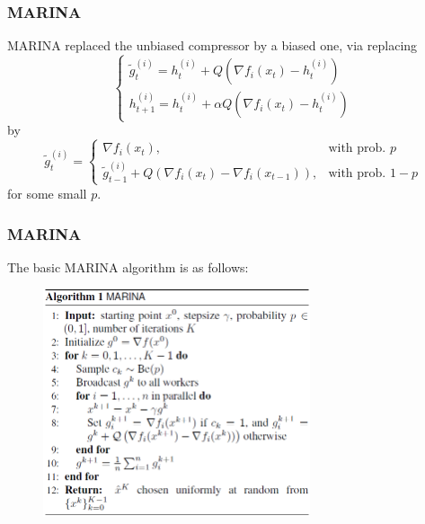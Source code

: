 \begin{frame}
\frametitle{MARINA}

MARINA \cite{gorbunov2021marina} replaced the unbiased compressor by a {\color{red}biased} one, via replacing
\begin{equation*}
\begin{cases}
\widetilde{g}^{(i)}_t = h^{(i)}_t + Q(\nabla f_i(x_t) - h^{(i)}_t) \\
h^{(i)}_{t+1} = h^{(i)}_t + \alpha Q(\nabla f_i(x_t) - h^{(i)}_t)
\end{cases}
\end{equation*}
by
\begin{equation*}
\widetilde{g}^{(i)}_t = 
\begin{cases}
\nabla f_i(x_t), & \text{with prob. } p \\
\widetilde{g}^{(i)}_{t-1} + Q(\nabla f_i(x_t) - \nabla f_i(x_{t-1})), & \text{with prob. } 1-p
\end{cases}
\end{equation*}
for some small $p$.



\end{frame}


\begin{frame}
\frametitle{MARINA}

The basic MARINA algorithm is as follows:

\begin{figure}
    \centering
    \includegraphics[width=0.7\textwidth,keepaspectratio]{images/marina.png}
\end{figure}

\end{frame}

